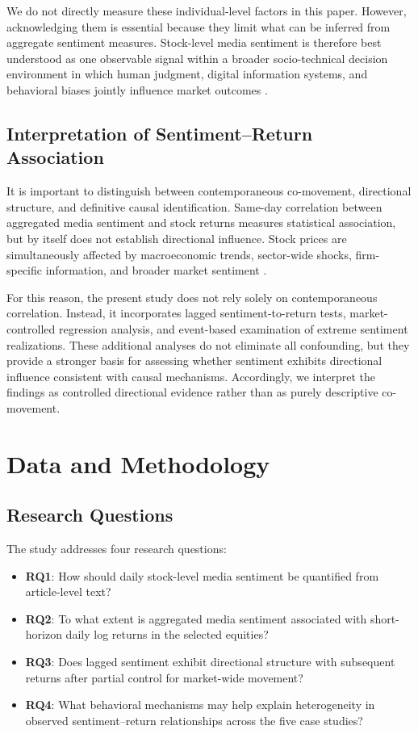\documentclass[lettersize,journal]{IEEEtran}
\begin{document}
We do not directly measure these individual-level factors in this paper. However, acknowledging them is essential because they limit what can be inferred from aggregate sentiment measures. Stock-level media sentiment is therefore best understood as one observable signal within a broader socio-technical decision environment in which human judgment, digital information systems, and behavioral biases jointly influence market outcomes \cite{tetlock2007giving, kahneman2011thinking}.

\subsection{Interpretation of Sentiment--Return Association}
It is important to distinguish between contemporaneous co-movement, directional structure, and definitive causal identification. Same-day correlation between aggregated media sentiment and stock returns measures statistical association, but by itself does not establish directional influence. Stock prices are simultaneously affected by macroeconomic trends, sector-wide shocks, firm-specific information, and broader market sentiment \cite{campbell1997econometrics}.

For this reason, the present study does not rely solely on contemporaneous correlation. Instead, it incorporates lagged sentiment-to-return tests, market-controlled regression analysis, and event-based examination of extreme sentiment realizations. These additional analyses do not eliminate all confounding, but they provide a stronger basis for assessing whether sentiment exhibits directional influence consistent with causal mechanisms. Accordingly, we interpret the findings as controlled directional evidence rather than as purely descriptive co-movement.

\section{Data and Methodology}
\label{sec:data_method}

\subsection{Research Questions}
The study addresses four research questions:
\begin{itemize}
    \item \textbf{RQ1}: How should daily stock-level media sentiment be quantified from article-level text?
    \item \textbf{RQ2}: To what extent is aggregated media sentiment associated with short-horizon daily log returns in the selected equities?
    \item \textbf{RQ3}: Does lagged sentiment exhibit directional structure with subsequent returns after partial control for market-wide movement?
    \item \textbf{RQ4}: What behavioral mechanisms may help explain heterogeneity in observed sentiment--return relationships across the five case studies?
\end{itemize}
\end{document}
